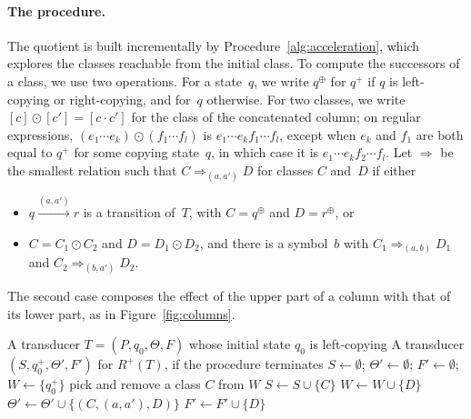 \paragraph{The procedure.}
The quotient is built incrementally by Procedure~\ref{alg:acceleration}, which
explores the classes reachable from the initial class. To compute the
successors of a class, we use two operations. For a state~$q$, we write
$q^\oplus$ for $q^+$ if $q$ is left-copying or right-copying, and for~$q$
otherwise. For two classes, we write $[c] \odot [c'] = [c \cdot c']$ for the
class of the concatenated column; on regular expressions, $(e_1 \cdots e_k)
\odot (f_1 \cdots f_l)$ is $e_1 \cdots e_k f_1 \cdots f_l$, except when $e_k$
and $f_1$ are both equal to $q^+$ for some copying state~$q$, in which case it
is $e_1 \cdots e_k f_2 \cdots f_l$. Let $\Rightarrow$ be the smallest relation
such that $C \Rightarrow_{(a,a')} D$ for classes $C$ and~$D$ if either
\begin{itemize}[leftmargin=*,nosep]
\item $q \xrightarrow{(a,a')} r$ is a transition of~$T$, with $C = q^\oplus$
and $D = r^\oplus$, or
\item $C = C_1 \odot C_2$ and $D = D_1 \odot D_2$, and there is a symbol~$b$
with $C_1 \Rightarrow_{(a,b)} D_1$ and $C_2 \Rightarrow_{(b,a')} D_2$.
\end{itemize}
The second case composes the effect of the upper part of a column with that of
its lower part, as in Figure~\ref{fig:columns}.

\begin{algorithm}[t]
\caption{Acceleration by quotienting}
\label{alg:acceleration}
\begin{algorithmic}[1]
\REQUIRE A transducer $T = (P, q_0, \Theta, F)$ whose initial state $q_0$ is left-copying
\ENSURE A transducer $(S, q_0^+, \Theta', F')$ for $R^+(T)$, if the procedure terminates
\STATE $S \leftarrow \emptyset$; $\Theta' \leftarrow \emptyset$; $F' \leftarrow \emptyset$; $W \leftarrow \{q_0^+\}$
  \STATE pick and remove a class $C$ from $W$
    \STATE $S \leftarrow S \cup \{C\}$
      \STATE $W \leftarrow W \cup \{D\}$
      \STATE $\Theta' \leftarrow \Theta' \cup \{(C, (a,a'), D)\}$
        \STATE $F' \leftarrow F' \cup \{D\}$
      \ENDIF
    \ENDFOR
  \ENDIF
\ENDWHILE
\end{algorithmic}
\end{algorithm}

